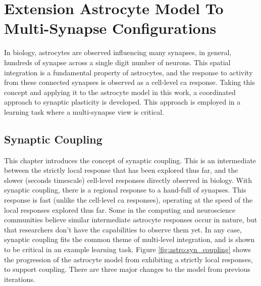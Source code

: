 \documentclass[conference]{IEEEtran}
\newcommand{\ca}{\gls{ca}\textrm{ }}
\newcommand{\cam}{Ca^{2+}}
\newcommand{\asvgf}[4]{
	\begin{figure}[htbp]
    	\centering
		\adjustbox{max width=#4\linewidth}{}
        \caption{#2.}
        \label{#3}
	\end{figure}
}
\begin{document}


\section{Extension Astrocyte Model To Multi-Synapse Configurations}

In biology, astrocytes are observed influencing many synapses, in general,
hundreds of synapse across a single digit number of neurons. This spatial
integration is a fundamental property of astrocytes, and the response to
activity from these connected synapses is observed as a cell-level \ca
response. Taking this concept and applying it to the astrocyte model
in this work, a coordinated approach to synaptic plasticity is developed. This
approach is employed in a learning task where a multi-synapse view is critical.

\subsection{Synaptic Coupling}
This chapter introduces the concept of synaptic coupling. This is an
intermediate between the strictly local response that has been explored thus
far, and the slower (seconds timescale) cell-level responses directly observed
in biology. With synaptic coupling, there is a regional response to a hand-full
of synapses. This response is fast (unlike the cell-level \ca responses),
operating at the speed of the local responses explored thus far. Some in the
computing and neuroscience communities believe similar intermediate
astrocyte responses occur in nature, but that researchers don't have the
capabilities to observe them yet. In any case, synaptic coupling fits the common
theme of multi-level integration, and is shown to be critical in an example
learning task. Figure \ref{fig:astro:syn_coupling} shows the progression of the
astrocyte model from exhibiting a strictly local responses, to support
coupling. There are three major changes to the model from previous iterations.
\end{document}
